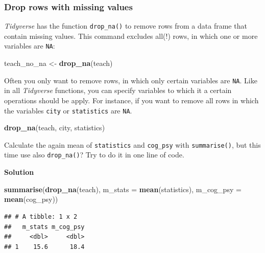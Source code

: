 \documentclass[
]{scrartcl}
\makeatletter
\newenvironment{Shaded}{\begin{snugshade}}{\end{snugshade}}
\newcommand{\DataTypeTok}[1]{\textcolor[rgb]{0.13,0.29,0.53}{#1}}
\newcommand{\KeywordTok}[1]{\textcolor[rgb]{0.13,0.29,0.53}{\textbf{#1}}}
\newcommand{\NormalTok}[1]{#1}
\newcommand{\StringTok}[1]{\textcolor[rgb]{0.31,0.60,0.02}{#1}}
\newenvironment{kframe}{%
\medskip{}
\setlength{\fboxsep}{.8em}
 \def\at@end@of@kframe{}%
 \ifinner\ifhmode%
  \def\at@end@of@kframe{\end{minipage}}%
  \begin{minipage}{\columnwidth}%
 \fi\fi%
 \def\FrameCommand##1{\hskip\@totalleftmargin \hskip-\fboxsep
 \colorbox{shadecolor}{##1}\hskip-\fboxsep
     \hskip-\linewidth \hskip-\@totalleftmargin \hskip\columnwidth}%
 \MakeFramed {\advance\hsize-\width
   \@totalleftmargin\z@ \linewidth\hsize
   \@setminipage}}%
 {\par\unskip\endMakeFramed%
 \at@end@of@kframe}
\newenvironment{rmdblock}[1]
  {
  \begin{itemize}
  \renewcommand{\labelitemi}{
    \raisebox{-.7\height}[0pt][0pt]{
      {\setkeys{Gin}{width=3em,keepaspectratio}\texttt{[image: images/\#1]}}
    }
  }
  \setlength{\fboxsep}{1em}
  \begin{kframe}
  \item
  }
  {
  \end{kframe}
  \end{itemize}
  }
\newenvironment{myexercise}
    {\begin{rmdblock}{exercise_green}}
    {\end{rmdblock}}
\newenvironment{webexsolution}[1]
    {\par\tiny\textbf{#1}}
    {\par}
\newcommand{\webexhide}[1]{\begin{webexsolution}{#1}}
\makeatother
\begin{document}
\hypertarget{drop-rows-with-missing-values}{%
\subsubsection{Drop rows with missing values}\label{drop-rows-with-missing-values}}

\emph{Tidyverse} has the function \texttt{drop\_na()} to remove rows from a data frame that contain missing values. This command excludes all(!) rows, in which one or more variables are \texttt{NA}:

\begin{Shaded}
\begin{Highlighting}[]
\NormalTok{teach\_no\_na \textless{}{-}}\StringTok{ }\KeywordTok{drop\_na}\NormalTok{(teach)}
\end{Highlighting}
\end{Shaded}

Often you only want to remove rows, in which only certain variables are \texttt{NA}. Like in all \emph{Tidyverse} functions, you can specify variables to which it a certain operations should be apply. For instance, if you want to remove all rows in which the variables \texttt{city} or \texttt{statistics} are \texttt{NA}.

\begin{Shaded}
\begin{Highlighting}[]
\KeywordTok{drop\_na}\NormalTok{(teach, city, statistics)}
\end{Highlighting}
\end{Shaded}

\begin{myexercise}
Calculate the again mean of \texttt{statistics} and \texttt{cog\_psy}
with \texttt{summarise()}, but this time use also \texttt{drop\_na()}?
Try to do it in one line of code.
\end{myexercise}
\webexhide{Solution}

\begin{Shaded}
\begin{Highlighting}[]
\KeywordTok{summarise}\NormalTok{(}\KeywordTok{drop\_na}\NormalTok{(teach), }\DataTypeTok{m\_stats =} \KeywordTok{mean}\NormalTok{(statistics),}
          \DataTypeTok{m\_cog\_psy =} \KeywordTok{mean}\NormalTok{(cog\_psy))}
\end{Highlighting}
\end{Shaded}

\begin{verbatim}
## # A tibble: 1 x 2
##   m_stats m_cog_psy
##     <dbl>     <dbl>
## 1    15.6      18.4
\end{verbatim}
\end{document}
